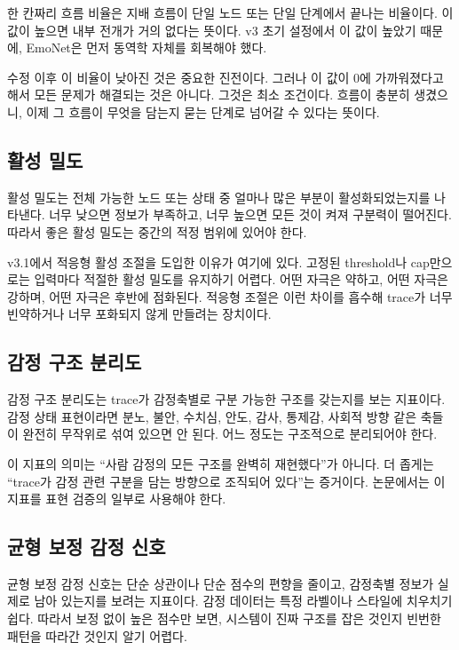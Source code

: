 \documentclass[11pt,a4paper]{article}
\begin{document}
한 칸짜리 흐름 비율은 지배 흐름이 단일 노드 또는 단일 단계에서 끝나는 비율이다. 이 값이 높으면 내부 전개가 거의 없다는 뜻이다. v3 초기 설정에서 이 값이 높았기 때문에, EmoNet은 먼저 동역학 자체를 회복해야 했다.

수정 이후 이 비율이 낮아진 것은 중요한 진전이다. 그러나 이 값이 0에 가까워졌다고 해서 모든 문제가 해결되는 것은 아니다. 그것은 최소 조건이다. 흐름이 충분히 생겼으니, 이제 그 흐름이 무엇을 담는지 묻는 단계로 넘어갈 수 있다는 뜻이다.

\subsection{활성 밀도}

활성 밀도는 전체 가능한 노드 또는 상태 중 얼마나 많은 부분이 활성화되었는지를 나타낸다. 너무 낮으면 정보가 부족하고, 너무 높으면 모든 것이 켜져 구분력이 떨어진다. 따라서 좋은 활성 밀도는 중간의 적정 범위에 있어야 한다.

v3.1에서 적응형 활성 조절을 도입한 이유가 여기에 있다. 고정된 threshold나 cap만으로는 입력마다 적절한 활성 밀도를 유지하기 어렵다. 어떤 자극은 약하고, 어떤 자극은 강하며, 어떤 자극은 후반에 점화된다. 적응형 조절은 이런 차이를 흡수해 trace가 너무 빈약하거나 너무 포화되지 않게 만들려는 장치이다.

\subsection{감정 구조 분리도}

감정 구조 분리도는 trace가 감정축별로 구분 가능한 구조를 갖는지를 보는 지표이다. 감정 상태 표현이라면 분노, 불안, 수치심, 안도, 감사, 통제감, 사회적 방향 같은 축들이 완전히 무작위로 섞여 있으면 안 된다. 어느 정도는 구조적으로 분리되어야 한다.

이 지표의 의미는 ``사람 감정의 모든 구조를 완벽히 재현했다''가 아니다. 더 좁게는 ``trace가 감정 관련 구분을 담는 방향으로 조직되어 있다''는 증거이다. 논문에서는 이 지표를 표현 검증의 일부로 사용해야 한다.

\subsection{균형 보정 감정 신호}

균형 보정 감정 신호는 단순 상관이나 단순 점수의 편향을 줄이고, 감정축별 정보가 실제로 남아 있는지를 보려는 지표이다. 감정 데이터는 특정 라벨이나 스타일에 치우치기 쉽다. 따라서 보정 없이 높은 점수만 보면, 시스템이 진짜 구조를 잡은 것인지 빈번한 패턴을 따라간 것인지 알기 어렵다.
\end{document}
